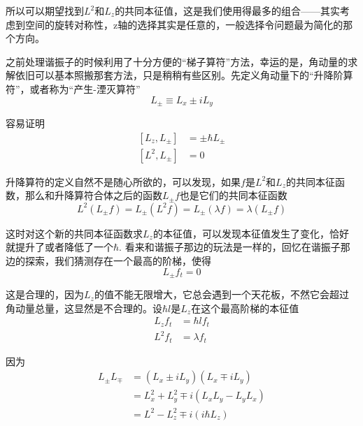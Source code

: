 \documentclass[UTF8]{ctexart}
\begin{document}
\noindent 所以可以期望找到$L^2$和$L_z$的共同本征值，这是我们使用得最多的组合——其实考虑到空间的旋转对称性，z轴的选择其实是任意的，一般选择令问题最为简化的那个方向。

    之前处理谐振子的时候利用了十分方便的“梯子算符”方法，幸运的是，角动量的求解依旧可以基本照搬那套方法，只是稍稍有些区别。先定义角动量下的“升降阶算符”，或者称为“产生-湮灭算符”
    \begin{equation}
        L_{\pm} \equiv L_x \pm i L_y
    \end{equation}

\noindent 容易证明 
\begin{equation}
    \begin{aligned}
        \left[L_z,L_{\pm}\right]&= \pm \hbar L_{\pm} \\
        [L^2,L_{\pm}]& = 0
    \end{aligned}
\end{equation}

    升降算符的定义自然不是随心所欲的，可以发现，如果$f$是$L^2$和$L_z$的共同本征函数，那么和升降算符合体之后的函数$L_{\pm}f$也是它们的共同本征函数
    \begin{equation}
        L^{2}\left(L_{\pm} f\right)=L_{\pm}\left(L^{2} f\right)=L_{\pm}(\lambda f)=\lambda\left(L_{\pm} f\right)
        \end{equation}
    
\noindent 这时对这个新的共同本征函数求$L_z$的本征值，可以发现本征值发生了变化，恰好就提升了或者降低了一个$\hbar$. 看来和谐振子那边的玩法是一样的，回忆在谐振子那边的探索，我们猜测存在一个最高的阶梯，使得
\begin{equation}
    L_{\pm} f_t = 0
\end{equation}

\noindent 这是合理的，因为$L_z$的值不能无限增大，它总会遇到一个天花板，不然它会超过角动量总量，这显然是不合理的。设$\hbar l$是$L_z$在这个最高阶梯的本征值
\begin{equation}
    \begin{aligned}
        L_z f_t &= \hbar l f_t \\
        L^2 f_t &= \lambda f_t
    \end{aligned}
\end{equation}

\noindent 因为 
\begin{equation}
\begin{aligned} L_{\pm} L_{\mp} &=\left(L_{x} \pm i L_{y}\right)\left(L_{x} \mp i L_{y}\right)\\
&=L_{x}^{2}+L_{y}^{2} \mp i\left(L_{x} L_{y}-L_{y} L_{x}\right) \\ &=L^{2}-L_{z}^{2} \mp i\left(i \hbar L_{z}\right) \end{aligned}
\end{equation}
\end{document}
